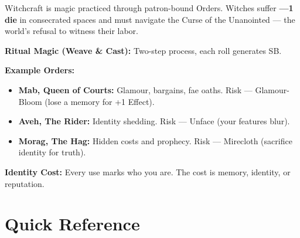 \begin{tcolorbox}[colback=green!5!white,colframe=green!75!black,title=Witchcraft (Optional),breakable]
Witchcraft is magic practiced through patron-bound Orders. Witches suffer \textbf{---1 die} in consecrated spaces and must navigate the Curse of the Unanointed --- the world's refusal to witness their labor.

\medskip
\textbf{Ritual Magic (Weave \& Cast):} Two-step process, each roll generates SB.

\medskip
\textbf{Example Orders:}
\begin{itemize}
  \item \textbf{Mab, Queen of Courts:} Glamour, bargains, fae oaths. Risk --- Glamour-Bloom (lose a memory for +1 Effect).
  \item \textbf{Aveh, The Rider:} Identity shedding. Risk --- Unface (your features blur).
  \item \textbf{Morag, The Hag:} Hidden costs and prophecy. Risk --- Mirecloth (sacrifice identity for truth).
\end{itemize}

\medskip
\textbf{Identity Cost:} Every use marks who you are. The cost is memory, identity, or reputation.
\end{tcolorbox}

\section{Quick Reference}
\label{sec:magic-quickref}


